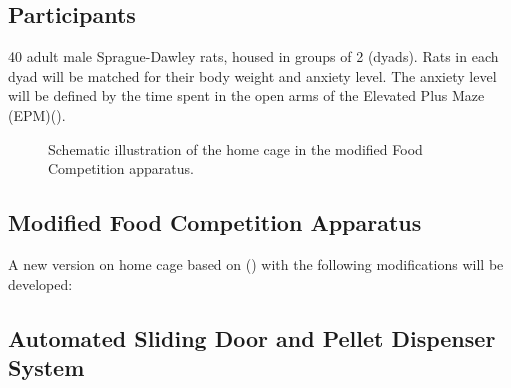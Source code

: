 \documentclass[english, a4paper, 11pt]{article}
\begin{document}
\subsection*{Participants}
40 adult male Sprague-Dawley rats, housed in groups of 2 (dyads). Rats in each dyad will be matched for their body weight and anxiety level. The anxiety level will be defined by the time spent in the open arms of the Elevated Plus Maze (EPM)(\cite{herreroIndividualDifferencesAnxiety2006,timmerEvidenceRoleOxytocin2011}).




\begin{figure}[h]
    \centering
    \caption{Schematic illustration of the home cage in the modified Food Competition apparatus.}
    \label{fig:modified_apparatus}
\end{figure}


\subsection*{Modified Food Competition Apparatus }

A new version on home cage based on \cite{costaNovelCompetitionTest2021a}() with the following modifications will be developed:
\subsection*{Automated Sliding Door and Pellet Dispenser System}
\end{document}
